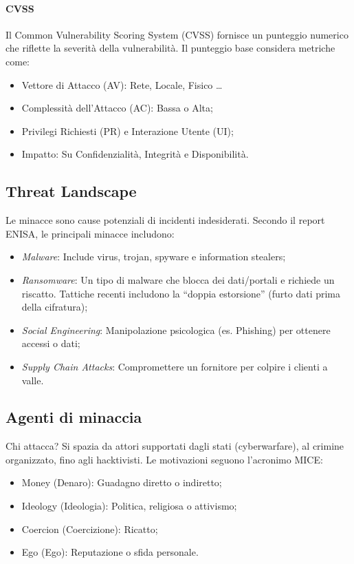 %
\paragraph{CVSS} Il Common Vulnerability Scoring System (CVSS) fornisce un punteggio numerico che riflette la severità della vulnerabilità. Il punteggio base considera metriche come:
\begin{itemize}
    \item Vettore di Attacco (AV): Rete, Locale, Fisico \dots
    \item Complessità dell'Attacco (AC): Bassa o Alta;
    \item Privilegi Richiesti (PR) e Interazione Utente (UI);
    \item Impatto: Su Confidenzialità, Integrità e Disponibilità.
\end{itemize}

%
\subsection{Threat Landscape}
Le minacce sono cause potenziali di incidenti indesiderati. Secondo il report ENISA, le principali minacce includono:
\begin{itemize}
    \item \emph{Malware}: Include virus, trojan, spyware e information stealers;
    \item \emph{Ransomware}: Un tipo di malware che blocca dei dati/portali e richiede un riscatto. Tattiche recenti includono la ``doppia estorsione'' (furto dati prima della cifratura);
    \item \emph{Social Engineering}: Manipolazione psicologica (es. Phishing) per ottenere accessi o dati;
    \item \emph{Supply Chain Attacks}: Compromettere un fornitore per colpire i clienti a valle.
\end{itemize}

%
\subsection{Agenti di minaccia}
Chi attacca? Si spazia da attori supportati dagli stati (cyberwarfare), al crimine organizzato, fino agli hacktivisti. Le motivazioni seguono l'acronimo MICE:
\begin{itemize}
    \item Money (Denaro): Guadagno diretto o indiretto;
    \item Ideology (Ideologia): Politica, religiosa o attivismo;
    \item Coercion (Coercizione): Ricatto;
    \item Ego (Ego): Reputazione o sfida personale.
\end{itemize}

